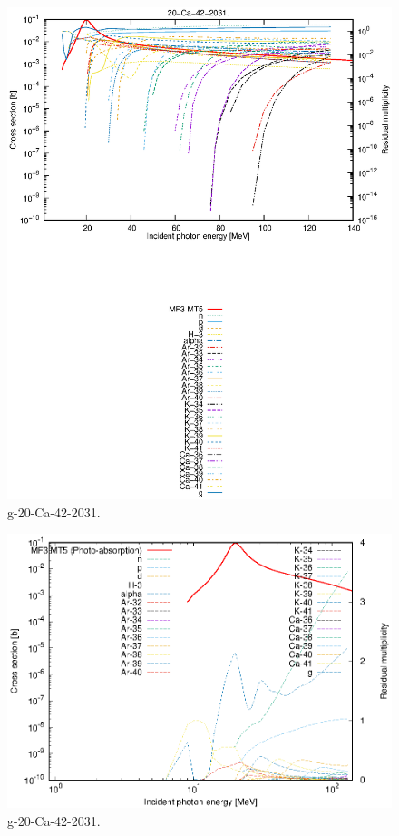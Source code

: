 \begin{figure}
 \includegraphics[width=\linewidth]{eps/g_20-Ca-42_2031.eps}
  \caption{g-20-Ca-42-2031.}
\end{figure}
\newpage \clearpage

\begin{figure}
 \includegraphics[width=\linewidth]{eps-log/g_20-Ca-42_2031.eps}
 \caption{g-20-Ca-42-2031.}
\end{figure}
\newpage \clearpage

